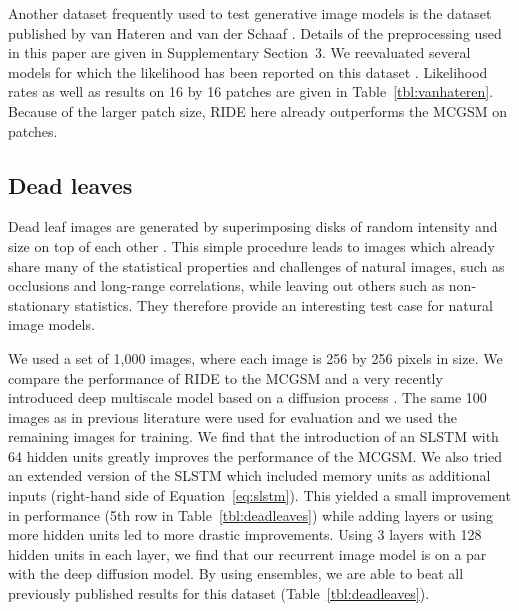 \documentclass{article}
\begin{document}
		Another dataset frequently used to test generative image models is the dataset published by
		van Hateren and van der Schaaf \cite{vanHateren:1998}. Details of the preprocessing used in
		this paper are given in Supplementary Section~3. We reevaluated several models for which the
		likelihood has been reported on this dataset \cite{Gerhard:2015,Theis:2011,Theis:2012a,Theis:2012b}.
		Likelihood rates as well as results on 16 by 16 patches are given in Table~\ref{tbl:vanhateren}.
		Because of the larger patch size, RIDE here already outperforms the MCGSM on patches.

		\subsection{Dead leaves}
		Dead leaf images are generated by superimposing disks of random intensity and
		size on top of each other \cite{Matheron:1968,Lee:2001}. This simple procedure leads to images which already share many
		of the statistical properties and challenges of natural images, such as occlusions and
		long-range correlations, while leaving out others such as non-stationary statistics. They
		therefore provide an interesting test case for natural image models.

		We used a set of 1,000 images, where each image is 256 by 256 pixels in size.
		We compare the performance of RIDE to the MCGSM and a very recently introduced deep
		multiscale model based on a diffusion process \cite{Sohl-Dickstein:2015}.
		The same 100 images as in previous literature \cite{Theis:2012a,Sohl-Dickstein:2015} were
		used for evaluation and we used the remaining images for training. We find that the
		introduction of an SLSTM with 64 hidden units greatly improves the performance of the MCGSM. We also tried an extended version of
		the SLSTM which included memory units as additional inputs (right-hand side of Equation~\ref{eq:slstm}).
		This yielded a small improvement in performance (5th row in Table~\ref{tbl:deadleaves}) while adding layers or using more
		hidden units led to more drastic improvements. Using 3 layers with 128 hidden units in each
		layer, we find that our recurrent image model is on a par with the deep diffusion model.
		By using ensembles, we are able to beat all previously published results for this dataset
		(Table~\ref{tbl:deadleaves}).
\end{document}

